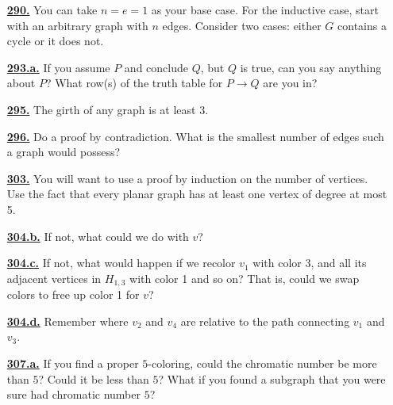 \documentclass[10pt,]{book}
\theoremstyle{plain}
\theoremstyle{definition}
\theoremstyle{definition}
\theoremstyle{definition}
\numberwithin{equation}{chapter}
\def\imp{\rightarrow}
\begin{document}
\begin{itemize}[itemsep=1em]
\hypertarget{a-290}{}\item[\textbf{\hyperref[activity-285]{290.}}]
\hypertarget{p-1507}{}%
You can take \(n = e = 1\) as your base case.  For the inductive case, start with an arbitrary graph with \(n\) edges.  Consider two cases: either \(G\) contains a cycle or it does not.%

\hypertarget{a-293.a}{}\item[\textbf{\hyperref[task-259]{293.a.}}]
\hypertarget{p-1529}{}%
If you assume \(P\) and conclude \(Q\), but \(Q\) is true, can you say anything about \(P\)?  What row(s) of the truth table for \(P \imp Q\) are you in?%

\hypertarget{a-295}{}\item[\textbf{\hyperref[activity-290]{295.}}]
\hypertarget{p-1545}{}%
The girth of any graph is at least 3.%

\hypertarget{a-296}{}\item[\textbf{\hyperref[act-planardeg5]{296.}}]
\hypertarget{p-1548}{}%
Do a proof by contradiction.  What is the smallest number of edges such a graph would possess?%

\hypertarget{a-303}{}\item[\textbf{\hyperref[activity-296]{303.}}]
\hypertarget{p-1603}{}%
You will want to use a proof by induction on the number of vertices.  Use the fact that every planar graph has at least one vertex of degree at most 5.%

\hypertarget{a-304.b}{}\item[\textbf{\hyperref[task-272]{304.b.}}]
\hypertarget{p-1610}{}%
If not, what could we do with \(v\)?%

\hypertarget{a-304.c}{}\item[\textbf{\hyperref[task-273]{304.c.}}]
\hypertarget{p-1612}{}%
If not, what would happen if we recolor \(v_1\) with color 3, and all its adjacent vertices in \(H_{1,3}\) with color 1 and so on?  That is, could we swap colors to free up color 1 for \(v\)?%

\hypertarget{a-304.d}{}\item[\textbf{\hyperref[task-274]{304.d.}}]
\hypertarget{p-1614}{}%
Remember where \(v_2\) and \(v_4\) are relative to the path connecting \(v_1\) and \(v_3\).%

\hypertarget{a-307.a}{}\item[\textbf{\hyperref[task-275]{307.a.}}]
\hypertarget{p-1628}{}%
If you find a proper \(5\)-coloring, could the chromatic number be more than \(5\)?  Could it be less than \(5\)?  What if you found a subgraph that you were sure had chromatic number \(5\)?%


\end{itemize}
\end{document}

